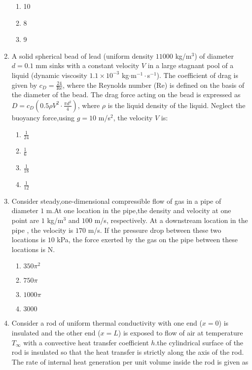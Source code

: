 \documentclass[journal,12pt,onecolumn]{IEEEtran}
\theoremstyle{remark}
\begin{document}
\begin{enumerate}
\begin{enumerate}
        \item 10
        \item 8
        \item 9
    \end{enumerate}
    \item A solid spherical bead of lead (uniform density $11000$ kg/m$^3$) of diameter $d = 0.1$ mm sinks with a constant velocity $V$ in a large stagnant pool of a liquid (dynamic viscosity $1.1 \times 10^{-3}$ kg$\cdot$m$^{-1}\cdot$s$^{-1}$). The coefficient of drag is given by $c_D = \frac{24}{\text{Re}}$, where the Reynolds number ($\text{Re}$) is defined on the basis of the diameter of the bead. The drag force acting on the bead is expressed as $D = c_D \left(0.5 \rho V^2 \cdot \frac{\pi d^2}{4}\right)$, where $\rho$ is the liquid density of the liquid. Neglect the buoyancy force,using $g = 10$ m/s$^2$, the velocity $V$ is:
    \begin{enumerate}
        \item $\frac{1}{24}$
        \item $\frac{1}{6}$
        \item $\frac{1}{18}$
        \item $\frac{1}{12}$
    \end{enumerate}
    \item Consider steady,one-dimensional compressible flow of gas in a pipe of diameter $1$ m.At one location in the pipe,the density and velocity at one point are $1$ kg/m$^3$ and $100$ m/s, respectively. At a downstream location in the pipe , the velocity is $170$ m/s. If the pressure drop between these two locations is $10$ kPa, the force exerted by the gas on the pipe between these locations is {\underline{\hspace{2cm}}} N.
    \begin{enumerate}
        \item $350\pi^2$
        \item $750\pi$
        \item $1000\pi$
        \item $3000$
    \end{enumerate}
    \item Consider a rod of uniform thermal conductivity with one end ($x = 0$) is insulated and the other end ($x = L$) is exposed to flow of air at temperature $T_\infty$ with a convective heat transfer coefficient $h$.the cylindrical surface of the rod is insulated so that the heat transfer is strictly along the axis of the rod. The rate of internal heat generation per unit volume inside the rod is given as

\end{enumerate}
\end{document}
